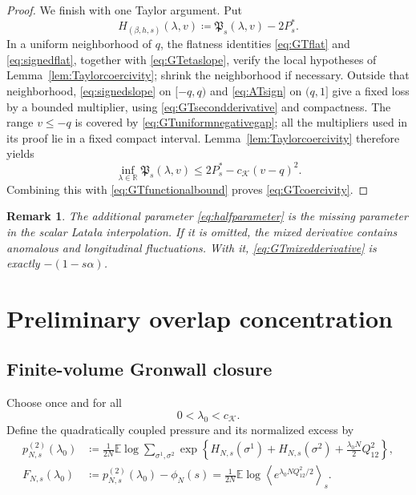 \documentclass[11pt]{article}
\newtheorem{remark}[theorem]{Remark}
\numberwithin{equation}{section}
\newcommand{\E}{\mathbb{E}}
\newcommand{\1}{\mathbf 1}
\newcommand{\cK}{\mathcal K}
\newcommand{\braket}[1]{\left\langle #1\right\rangle}
\begin{document}
\begin{proof}
We finish with one Taylor argument.  Put
\[
 H_{(\beta,h,s)}(\lambda,v)
 \coloneqq\mathfrak P_s(\lambda,v)-2P_s^*.
\]
In a uniform neighborhood of $q$, the flatness identities
\eqref{eq:GTflat} and \eqref{eq:signedflat}, together with
\eqref{eq:GTetaslope}, verify the local hypotheses of
Lemma~\ref{lem:Taylorcoercivity}; shrink the neighborhood if necessary.
Outside that neighborhood, \eqref{eq:signedslope} on $[-q,q)$ and
\eqref{eq:ATsign} on $(q,1]$ give a fixed loss by a bounded multiplier,
using \eqref{eq:GTsecondderivative} and compactness.  The range
$v\le-q$ is covered by \eqref{eq:GTuniformnegativegap}; all the
multipliers used in its proof lie in a fixed compact interval.
Lemma~\ref{lem:Taylorcoercivity} therefore yields
\[
 \inf_{\lambda\in\mathbb R}\mathfrak P_s(\lambda,v)
 \le2P_s^*-c_{\cK}(v-q)^2.
\]
Combining this with \eqref{eq:GTfunctionalbound} proves
\eqref{eq:GTcoercivity}.
\end{proof}

\begin{remark}
The additional parameter \eqref{eq:halfparameter} is the missing
parameter in the scalar Lata\l a interpolation.  If it is omitted, the
mixed derivative contains anomalous and longitudinal fluctuations.
With it, \eqref{eq:GTmixedderivative} is exactly
$-(1-s\alpha)$.
\end{remark}

\section{Preliminary overlap concentration}\label{sec:concentration}

\subsection{Finite-volume Gronwall closure}\label{subsec:gronwall}

Choose once and for all
\begin{equation}
 0<\lambda_0<c_{\cK}.
 \label{eq:lambda0}
\end{equation}
Define the quadratically coupled pressure and its normalized excess by
\begin{align}
 p^{(2)}_{N,s}(\lambda_0)
 &\coloneqq
 \frac1{2N}\E\log
 \sum_{\sigma^1,\sigma^2}
 \exp\left\{
 H_{N,s}(\sigma^1)+H_{N,s}(\sigma^2)
 +\frac{\lambda_0N}{2}Q_{12}^2\right\},
 \label{eq:quadraticpressure}\\
 F_{N,s}(\lambda_0)
 &\coloneqq
 p^{(2)}_{N,s}(\lambda_0)-\phi_N(s)
 =
 \frac1{2N}\E\log
 \braket{e^{\lambda_0NQ_{12}^2/2}}_s.
 \label{eq:normalizedcoupling}
\end{align}
\end{document}
